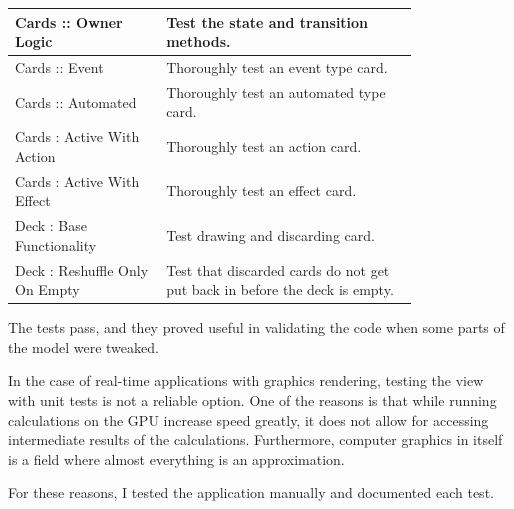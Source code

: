 \begin{center}
\begin{longtable}{ | m{0.3\linewidth} | m{0.5\linewidth} | }
        Cards :: Owner Logic & Test the state and transition methods. \\
        \hline
        Cards :: Event & Thoroughly test an event type card. \\
        \hline
        Cards :: Automated & Thoroughly test an automated type card. \\
        \hline
        Cards : Active With Action & Thoroughly test an action card. \\
        \hline
        Cards : Active With Effect & Thoroughly test an effect card. \\
        \hline

        Deck : Base Functionality & Test drawing and discarding card. \\
        \hline
        Deck : Reshuffle Only On Empty & Test that discarded cards do not get put back in before the deck is empty. \\
        \hline
    \end{longtable}
\end{center}

The tests pass, and they proved useful in validating the code when some parts of the model were tweaked.

In the case of real-time applications with graphics rendering, testing the view with unit tests is not a reliable option. One of the reasons is that while running calculations on the GPU increase speed greatly, it does not allow for accessing intermediate results of the calculations. Furthermore, computer graphics in itself is a field where almost everything is an approximation.

For these reasons, I tested the application manually and documented each test.

